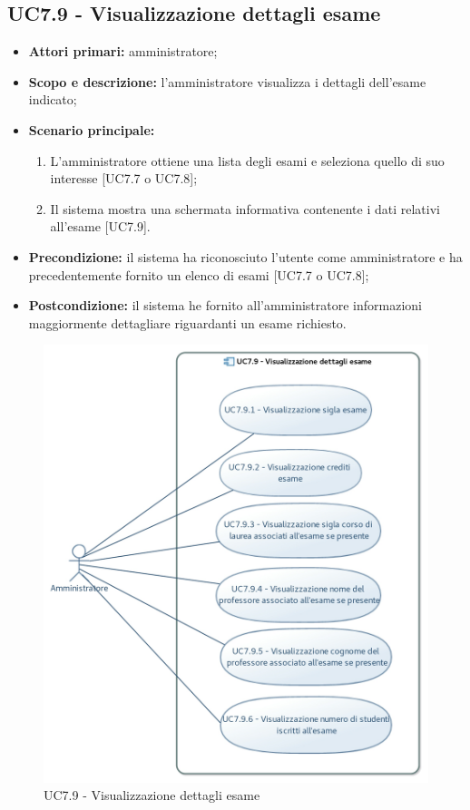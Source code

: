 \documentclass[AnalisiDeiRequisiti.tex]{subfiles}
\begin{document}
\subsection{UC7.9 - Visualizzazione dettagli esame}
\begin{itemize}
	\item \textbf{Attori primari:} amministratore;
	\item \textbf{Scopo e descrizione:} l'amministratore visualizza i dettagli dell'esame indicato;
	\item \textbf{Scenario principale:}
	\begin{enumerate}
		\item L'amministratore ottiene una lista degli esami e seleziona quello di suo interesse [UC7.7 o UC7.8];
		\item Il sistema mostra una schermata informativa contenente i dati relativi all'esame [UC7.9].
	\end{enumerate}
	\item \textbf{Precondizione:} il sistema ha riconosciuto l'utente come amministratore e ha precedentemente fornito un elenco di esami [UC7.7 o UC7.8]; 
	\item \textbf{Postcondizione:} il sistema he fornito all'amministratore informazioni maggiormente dettagliare riguardanti un esame richiesto.
\end{itemize}
\begin{figure}[H]
	\centering
	\includegraphics[width=0.7\linewidth]{UC7_9.jpg}
	\caption{UC7.9 - Visualizzazione dettagli esame}
	\label{fig:UC7.9 - Visualizzazione dettagli esame}
\end{figure}
\end{document}
